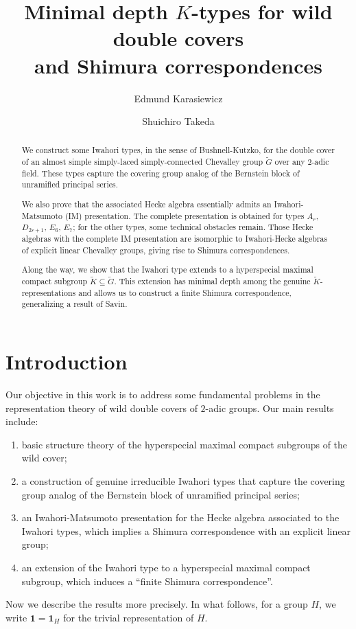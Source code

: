 \documentclass[10pt, letterpaper]{amsart}
\title[$K$-types for wild double covers]{Minimal depth $K$-types for wild double covers\\
and Shimura correspondences}
\author{Edmund Karasiewicz}
\author{Shuichiro Takeda}
\theoremstyle{plain}
\theoremstyle{definition}
\numberwithin{equation}{section}
\newcommand{\one}{\mathbf{1}}
\begin{document}
\begin{abstract}
	We construct some Iwahori types, in the sense of Bushnell-Kutzko, for the double cover of an almost simple simply-laced simply-connected Chevalley group $\widetilde{G}$ over any $2$-adic field. These types capture the covering group analog of the Bernstein block of unramified principal series. 
    
    We also prove that the associated Hecke algebra essentially admits an Iwahori-Matsumoto (IM) presentation. The complete presentation is obtained for types $A_{r}$, $D_{2r+1}$, $E_{6}$, $E_{7}$; for the other types, some technical obstacles remain. Those Hecke algebras with the complete IM presentation are isomorphic to Iwahori-Hecke algebras of explicit linear Chevalley groups, giving rise to Shimura correspondences.

    Along the way, we show that the Iwahori type extends to a hyperspecial maximal compact subgroup $\widetilde{K}\subseteq \widetilde{G}$. This extension has minimal depth among the genuine $\widetilde{K}$-representations and allows us to construct a finite Shimura correspondence, generalizing a result of Savin.
\end{abstract}

\maketitle


\setcounter{tocdepth}{1}
\tableofcontents


\section{Introduction}



Our objective in this work is to address some fundamental problems in the representation theory of wild double covers of $2$-adic groups. Our main results include: 
\begin{enumerate}[(1)]
	\item\label{IntroListKStructure} basic structure theory of the hyperspecial maximal compact subgroups of the wild cover;
	\item\label{IntroListITypes} a construction of genuine irreducible Iwahori types that capture the covering group analog of the Bernstein block of unramified principal series;
        \item\label{IntroListIMPres} an Iwahori-Matsumoto presentation for the Hecke algebra associated to the Iwahori types, which implies a Shimura correspondence with an explicit linear group;
        \item\label{IntroListKType} an extension of the Iwahori type to a hyperspecial maximal compact subgroup, which induces a ``finite Shimura correspondence''.
\end{enumerate}
Now we describe the results more precisely. In what follows, for a group $H$, we write $\one=\one_{H}$ for the trivial representation of $H$.
\end{document}
